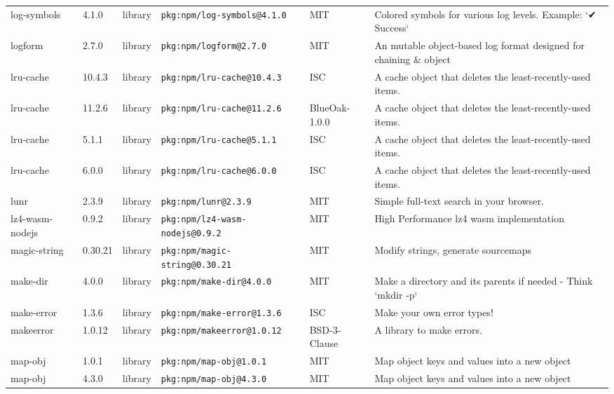 \documentclass[11pt,a4paper]{article}
\begin{document}
\begin{longtable}{|p{4cm}|p{2cm}|p{1.6cm}|p{5cm}|p{1.5cm}|p{3.5cm}|}
\raggedright log-symbols & 4.1.0 & library & \small\texttt{pkg:npm/log-symbols@4.1.0} & MIT & \small Colored symbols for various log levels. Example: `✔︎ Success` \\
\raggedright logform & 2.7.0 & library & \small\texttt{pkg:npm/logform@2.7.0} & MIT & \small An mutable object-based log format designed for chaining \& object \\
\raggedright lru-cache & 10.4.3 & library & \small\texttt{pkg:npm/lru-cache@10.4.3} & ISC & \small A cache object that deletes the least-recently-used items. \\
\raggedright lru-cache & 11.2.6 & library & \small\texttt{pkg:npm/lru-cache@11.2.6} & BlueOak-1.0.0 & \small A cache object that deletes the least-recently-used items. \\
\raggedright lru-cache & 5.1.1 & library & \small\texttt{pkg:npm/lru-cache@5.1.1} & ISC & \small A cache object that deletes the least-recently-used items. \\
\raggedright lru-cache & 6.0.0 & library & \small\texttt{pkg:npm/lru-cache@6.0.0} & ISC & \small A cache object that deletes the least-recently-used items. \\
\raggedright lunr & 2.3.9 & library & \small\texttt{pkg:npm/lunr@2.3.9} & MIT & \small Simple full-text search in your browser. \\
\raggedright lz4-wasm-nodejs & 0.9.2 & library & \small\texttt{pkg:npm/lz4-wasm-nodejs@0.9.2} & MIT & \small High Performance lz4 wasm implementation \\
\raggedright magic-string & 0.30.21 & library & \small\texttt{pkg:npm/magic-string@0.30.21} & MIT & \small Modify strings, generate sourcemaps \\
\raggedright make-dir & 4.0.0 & library & \small\texttt{pkg:npm/make-dir@4.0.0} & MIT & \small Make a directory and its parents if needed - Think `mkdir -p` \\
\raggedright make-error & 1.3.6 & library & \small\texttt{pkg:npm/make-error@1.3.6} & ISC & \small Make your own error types! \\
\raggedright makeerror & 1.0.12 & library & \small\texttt{pkg:npm/makeerror@1.0.12} & BSD-3-Clause & \small A library to make errors. \\
\raggedright map-obj & 1.0.1 & library & \small\texttt{pkg:npm/map-obj@1.0.1} & MIT & \small Map object keys and values into a new object \\
\raggedright map-obj & 4.3.0 & library & \small\texttt{pkg:npm/map-obj@4.3.0} & MIT & \small Map object keys and values into a new object \\

\end{longtable}
\end{document}
